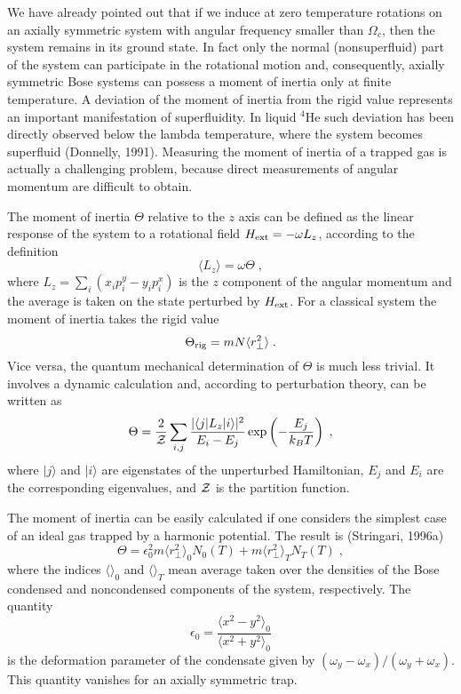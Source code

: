 We have already pointed out that if we induce at zero temperature
rotations on an axially symmetric system with angular frequency smaller than
$\Omega_c$, then the system remains in its ground state.  In fact only
the normal (nonsuperfluid) part of the system can participate in the
rotational motion and, consequently, axially symmetric Bose systems can 
possess a moment of inertia only at finite temperature. A deviation of
the moment of inertia from the rigid value represents an important
manifestation of superfluidity.  In liquid $^4$He such deviation has
been directly observed below the lambda temperature, where the system
becomes superfluid (Donnelly, 1991). Measuring the moment of inertia of a
trapped gas is actually a challenging problem, because direct measurements
of angular momentum are difficult to obtain. 

The moment of inertia $\Theta$ relative to the $z$ axis can be defined as
the linear response of the system to a rotational field $H_{\rm ext} = -\omega
L_z$, according to the definition
\begin{equation}
\langle L_z\rangle = \omega\Theta \;,
\label{eq:momin}
\end{equation}
where $L_z =\sum_i(x_ip_i^y-y_ip_i^x)$ is the $z$ component of the angular
momentum and the average is taken on the state perturbed by $H_{\rm ext}$. For
a classical system the moment of inertia takes the rigid value
\begin{equation}
\Theta_{\rm rig} = mN\langle r_\perp^2 \rangle \;.
\label{eq:momrig}
\end{equation}
Vice versa, the quantum mechanical determination of $\Theta$ is much less
trivial. It involves a dynamic calculation and, according to perturbation
theory, can be written as
\begin{equation}
\Theta = \frac{2}{{\cal Z}}\sum_{i,j} { |\langle j|L_z|i\rangle|^2 \over
E_i-E_j }  \exp \left( - { E_j \over k_BT } \right) \;,
\label{eq:momin1}
\end{equation}
where $|j\rangle$ and $|i\rangle$ are eigenstates of the unperturbed
Hamiltonian, $E_j$ and $E_i$ are the corresponding eigenvalues,  and
${\cal Z}$ is the partition function.

The moment of inertia can be easily calculated if one considers the
simplest case of an ideal gas trapped by a harmonic potential.
The result is (Stringari, 1996a)
\begin{equation}
\Theta = \epsilon_0^2 m \langle r_\perp^2 \rangle_0 N_0(T)
+ m\langle r_\perp^2 \rangle_T N_T(T) \;,
\label{eq:momin3}
\end{equation}
where the indices $\langle\rangle_0$ and $\langle\rangle_{T}$ mean
average taken over the densities of the Bose condensed and noncondensed
components of the system, respectively. The quantity
\begin{equation}
\epsilon_0 = \frac{\langle x^2 - y^2\rangle_0}{\langle x^2 + y^2\rangle_0}
\label{eq:defor}
\end{equation}
is the deformation parameter of the condensate given by $(\omega_y-
\omega_x)/ (\omega_y+\omega_x)$. This quantity vanishes for an axially
symmetric trap.

